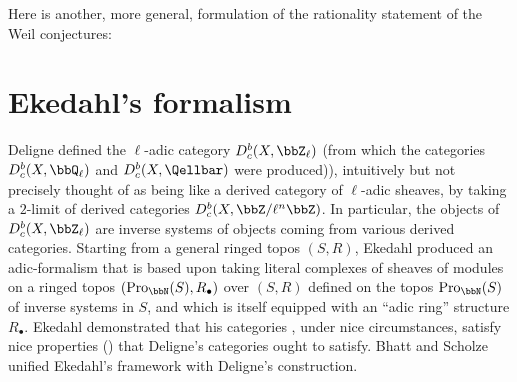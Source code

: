 Here is another, more general, formulation of the rationality statement of the Weil conjectures:




\section{Ekedahl's formalism}


Deligne \cite{deligne_lcwii} defined the $\ell$-adic category $D_c^b(X, \bbZ_\ell)$ (from which the categories $D_c^b(X, \bbQ_\ell)$ and $D_c^b(X, \Qellbar)$ were produced)), intuitively but not precisely thought of as being like a derived category of $\ell$-adic sheaves, by taking a $2$-limit of derived categories $D_c^b(X, \bbZ/\ell^n \bbZ)$. In particular, the objects of $D_c^b(X, \bbZ_\ell)$ are inverse systems of objects coming from various derived categories. Starting from a general ringed topos $(S, R)$, Ekedahl \cite{ekedahl_af} produced an adic-formalism that is based upon taking literal complexes of sheaves of modules on a ringed topos $(\mathrm{Pro}_\bbN(S), R_\bullet)$ over $(S,R)$ defined on the topos $\mathrm{Pro}_\bbN(S)$ of inverse systems in $S$, and which is itself equipped with an ``adic ring'' structure $R_\bullet$. Ekedahl demonstrated that his categories , under nice circumstances, satisfy nice properties () that Deligne's categories ought to satisfy. Bhatt and Scholze \cite{bhatt_scholze_pfgs} unified Ekedahl's framework with Deligne's construction. 









